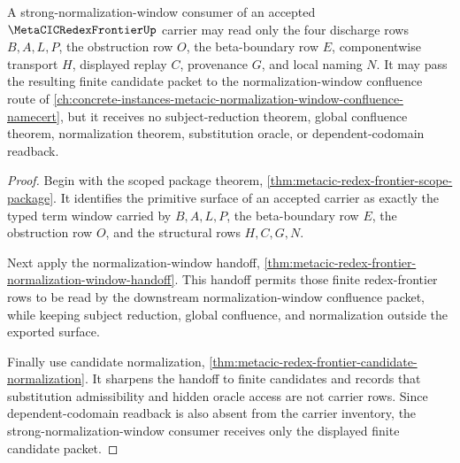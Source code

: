 \begin{theorem}
\label{thm:metacic-redex-frontier-candidate-sn-window}
A strong-normalization-window consumer of an accepted
$\MetaCICRedexFrontierUp$ carrier may read only the four discharge rows
$B,A,L,P$, the obstruction row $O$, the beta-boundary row $E$, componentwise
transport $H$, displayed replay $C$, provenance $G$, and local naming $N$. It
may pass the resulting finite candidate packet to the normalization-window
confluence route of
\autoref{ch:concrete-instances-metacic-normalization-window-confluence-namecert},
but it receives no subject-reduction theorem, global confluence theorem,
normalization theorem, substitution oracle, or dependent-codomain readback.
\end{theorem}
\begin{proof}
Begin with the scoped package theorem,
\autoref{thm:metacic-redex-frontier-scope-package}. It identifies the primitive
surface of an accepted carrier as exactly the typed term window carried by
$B,A,L,P$, the beta-boundary row $E$, the obstruction row $O$, and the
structural rows $H,C,G,N$.

Next apply the normalization-window handoff,
\autoref{thm:metacic-redex-frontier-normalization-window-handoff}. This
handoff permits those finite redex-frontier rows to be read by the downstream
normalization-window confluence packet, while keeping subject reduction,
global confluence, and normalization outside the exported surface.

Finally use candidate normalization,
\autoref{thm:metacic-redex-frontier-candidate-normalization}. It sharpens the
handoff to finite candidates and records that substitution admissibility and
hidden oracle access are not carrier rows. Since dependent-codomain readback
is also absent from the carrier inventory, the strong-normalization-window
consumer receives only the displayed finite candidate packet.
\end{proof}


